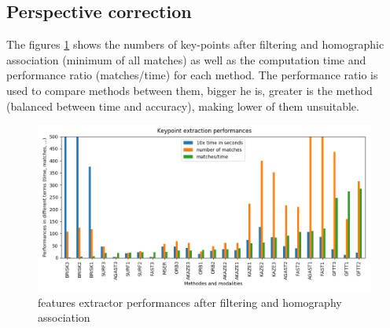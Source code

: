 \documentclass[a4paper,twoside]{article}
\begin{document}
	
	\subsection{Perspective correction}
	
	The figures \ref{fig:features-performances} shows the numbers of key-points after filtering and homographic association (minimum of all matches)
	as well as the computation time and performance ratio (matches/time) for each method.
	The performance ratio is used to compare methods between them, bigger he is,
	greater is the method (balanced between time and accuracy), making lower of them unsuitable.
	
	\begin{figure}[h]
		\centering
		\includegraphics[height=0.9\linewidth, angle=90]{../figures/comparaison-keypoint-performances.png}
		\caption{features extractor performances after filtering and homography association}
		\label{fig:features-performances}
	\end{figure}
	
\end{document}
